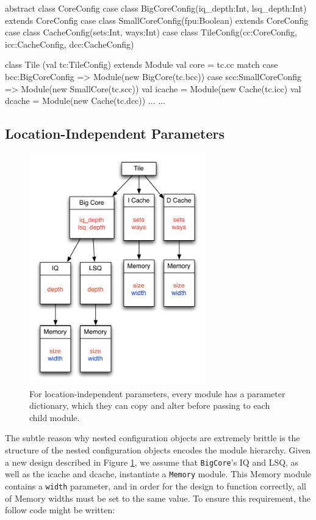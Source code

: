 \documentclass[10pt,twocolumn]{article}
\def\code#1{{\small\tt #1}}
\begin{document}
\begin{scala}
abstract class CoreConfig {}
case class BigCoreConfig(iq_depth:Int, lsq_depth:Int) extends CoreConfig
case class SmallCoreConfig(fpu:Boolean) extends CoreConfig
case class CacheConfig(sets:Int, ways:Int)
case class TileConfig(cc:CoreConfig, icc:CacheConfig, dcc:CacheConfig)

class Tile (val tc:TileConfig) extends Module { 
  val core = tc.cc match {
    case bcc:BigCoreConfig => Module(new BigCore(tc.bcc))
    case scc:SmallCoreConfig => Module(new SmallCore(tc.scc))
  }
  val icache = Module(new Cache(tc.icc)
  val dcache = Module(new Cache(tc.dcc))
  ... 
}
...
\end{scala}
  
\subsection{Location-Independent Parameters}

\begin{figure}[h]
\centering
\includegraphics[width=3in]{figs/ex3}
\caption{For location-independent parameters, every module has a parameter dictionary, which they can copy and alter before passing to each child module.}
\label{fig:ex3}
\end{figure}

The subtle reason why nested configuration objects are extremely brittle is the structure of the nested configuration objects encodes the module hierarchy. Given a new design described in Figure \ref{fig:ex3}, we assume that \code{BigCore}'s IQ and LSQ, as well as the icache and dcache, instantiate a \code{Memory} module. This Memory module contains a \code{width} parameter, and in order for the design to function correctly, all of Memory widths must be set to the same value. To ensure this requirement, the follow code might be written:
\end{document}
